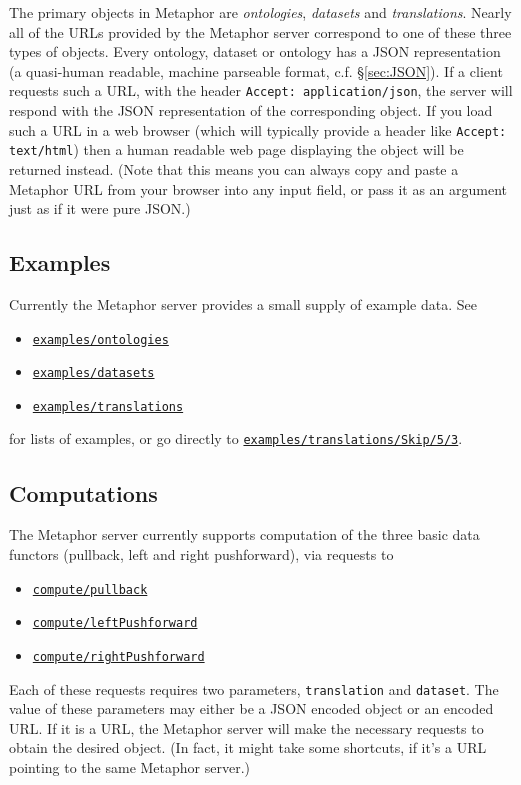 \documentclass{amsart}
\newcommand{\code}[1]{{\tt #1}}
\newcommand{\metaphor}[1]{\href{http://categoricaldata.net/metaphor/#1}{\tt #1}}
\begin{document}
The primary objects in Metaphor are \emph{ontologies}, \emph{datasets} and \emph{translations}. Nearly all of the URLs provided by the Metaphor server correspond to one of these three types of objects.  Every ontology, dataset or ontology has a JSON representation (a quasi-human readable, machine parseable format, c.f. \S \ref{sec:JSON}).  If a client requests such a URL, with the header \code{Accept: application/json}, the server will respond with the JSON representation of the corresponding object. If you load such a URL in a web browser (which will typically provide a header like \code{Accept: text/html}) then a human readable web page displaying the object will be returned instead. (Note that this means you can always copy and paste a Metaphor URL from your browser into any input field, or pass it as an argument just as if it were pure JSON.)

\subsection{Examples}
Currently the Metaphor server provides a small supply of example data. See
\begin{itemize}
\item \metaphor{examples/ontologies}
\item \metaphor{examples/datasets}
\item \metaphor{examples/translations}
\end{itemize}
for lists of examples, or go directly to \metaphor{examples/translations/Skip/5/3}.

\subsection{Computations}
The Metaphor server currently supports computation of the three basic data functors (pullback, left and right pushforward), via requests to
\begin{itemize}
\item \metaphor{compute/pullback}
\item \metaphor{compute/leftPushforward}
\item \metaphor{compute/rightPushforward}
\end{itemize}
Each of these requests requires two parameters, \code{translation} and \code{dataset}. The value of these parameters may either be a JSON encoded object or an encoded URL. If it is a URL, the Metaphor server will make the necessary requests to obtain the desired object. (In fact, it might take some shortcuts, if it's a URL pointing to the same Metaphor server.)
\end{document}
